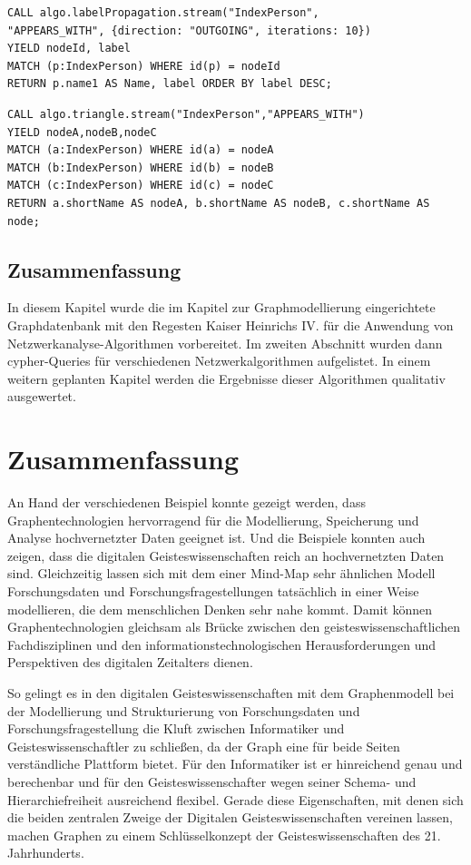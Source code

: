 \documentclass[ngerman,]{scrreprt}
\begin{document}
\begin{verbatim}
CALL algo.labelPropagation.stream("IndexPerson",
"APPEARS_WITH", {direction: "OUTGOING", iterations: 10})
YIELD nodeId, label
MATCH (p:IndexPerson) WHERE id(p) = nodeId
RETURN p.name1 AS Name, label ORDER BY label DESC;
\end{verbatim}

\begin{verbatim}
CALL algo.triangle.stream("IndexPerson","APPEARS_WITH")
YIELD nodeA,nodeB,nodeC
MATCH (a:IndexPerson) WHERE id(a) = nodeA
MATCH (b:IndexPerson) WHERE id(b) = nodeB
MATCH (c:IndexPerson) WHERE id(c) = nodeC
RETURN a.shortName AS nodeA, b.shortName AS nodeB, c.shortName AS node;
\end{verbatim}

\section{Zusammenfassung}\label{zusammenfassung-8}

In diesem Kapitel wurde die im Kapitel zur Graphmodellierung eingerichtete Graphdatenbank mit den Regesten Kaiser Heinrichs IV. für die Anwendung von Netzwerkanalyse-Algorithmen vorbereitet. Im zweiten Abschnitt wurden dann cypher-Queries für verschiedenen Netzwerkalgorithmen aufgelistet. In einem weitern geplanten Kapitel werden die Ergebnisse dieser Algorithmen qualitativ ausgewertet.

\chapter{Zusammenfassung}\label{zusammenfassung-9}

An Hand der verschiedenen Beispiel konnte gezeigt werden, dass Graphentechnologien hervorragend für die Modellierung, Speicherung und Analyse hochvernetzter Daten geeignet ist. Und die Beispiele konnten auch zeigen, dass die digitalen Geisteswissenschaften reich an hochvernetzten Daten sind. Gleichzeitig lassen sich mit dem einer Mind-Map sehr ähnlichen Modell Forschungsdaten und Forschungsfragestellungen tatsächlich in einer Weise modellieren, die dem menschlichen Denken sehr nahe kommt. Damit können Graphentechnologien gleichsam als Brücke zwischen den geisteswissenschaftlichen Fachdisziplinen und den informationstechnologischen Herausforderungen und Perspektiven des digitalen Zeitalters dienen.

So gelingt es in den digitalen Geisteswissenschaften mit dem Graphenmodell bei der Modellierung und Strukturierung von Forschungsdaten und Forschungsfragestellung die Kluft zwischen Informatiker und Geisteswissenschaftler zu schließen, da der Graph eine für beide Seiten verständliche Plattform bietet. Für den Informatiker ist er hinreichend genau und berechenbar und für den Geisteswissenschafter wegen seiner Schema- und Hierarchiefreiheit ausreichend flexibel. Gerade diese Eigenschaften, mit denen sich die beiden zentralen Zweige der Digitalen Geisteswissenschaften vereinen lassen, machen Graphen zu einem Schlüsselkonzept der Geisteswissenschaften des 21. Jahrhunderts.
\end{document}
